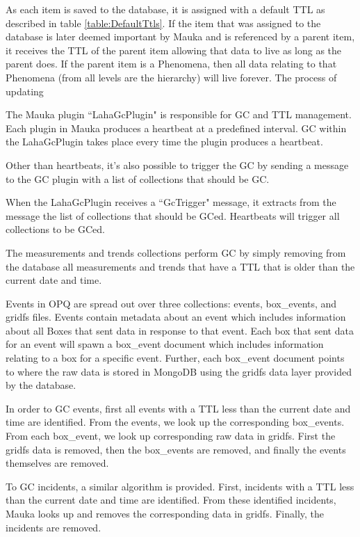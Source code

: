 As each item is saved to the database, it is assigned with a default TTL as described in table \ref{table:DefaultTtls}. If the item that was assigned to the database is later deemed important by Mauka and is referenced by a parent item, it receives the TTL of the parent item allowing that data to live as long as the parent does. If the parent item is a Phenomena, then all data relating to that Phenomena (from all levels are the hierarchy) will live forever. The process of updating

The Mauka plugin ``LahaGcPlugin" is responsible for GC and TTL management. Each plugin in Mauka produces a heartbeat at a predefined interval. GC within the LahaGcPlugin takes place every time the plugin produces a heartbeat.

Other than heartbeats, it's also possible to trigger the GC by sending a message to the GC plugin with a list of collections that should be GC.

When the LahaGcPlugin receives a ``GcTrigger" message, it extracts from the message the list of collections that should be GCed. Heartbeats will trigger all collections to be GCed.

The measurements and trends collections perform GC by simply removing from the database all measurements and trends that have a TTL that is older than the current date and time.

Events in OPQ are spread out over three collections: events, box\_events, and gridfs files. Events contain metadata about an event which includes information about all Boxes that sent data in response to that event. Each box that sent data for an event will spawn a box\_event document which includes information relating to a box for a specific event. Further, each box\_event document points to where the raw data is stored in MongoDB using the gridfs data layer provided by the database.

In order to GC events, first all events with a TTL less than the current date and time are identified. From the events, we look up the corresponding box\_events. From each box\_event, we look up corresponding raw data in gridfs. First the gridfs data is removed, then the box\_events are removed, and finally the events themselves are removed. 

To GC incidents, a similar algorithm is provided. First, incidents with a TTL less than the current date and time are identified. From these identified incidents, Mauka looks up and removes the corresponding data in gridfs. Finally, the incidents are removed.

